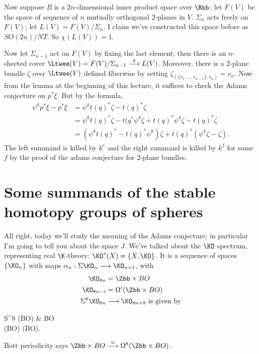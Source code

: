 Now suppose $B$ is a $2n$-dimensional inner product space over $\Rbb$; let $F(V)$ be the space of sequence of $n$ mutually orthogonal $2$-planes in $V$.  $\Sigma_n$ acts freely on $F(V)$; let $L(V) = F(V) / \Sigma_n$.  I claim we've constructed this space before as $SO(2n)/NT$.  So $\chi(L(V)) = 1$.

Now let $\Sigma_{n-1}$ act on $F(V)$ by fixing the last element; then there is an $n$-sheeted cover $\Ltwee(V) = F(V)/\Sigma_{n-1} \stackrel{q}{\to} L(V)$.  Moreover, there is a $2$-plane bundle $\zeta$ over $\Ltwee(V)$ defined fiberwise by setting $\zeta_{(\{v_1, \ldots, v_{n-1}\}, v_n)} = v_n$.  Now from the lemma at the beginning of this lecture, it suffices to check the Adams conjecture on $p^* \xi$.  But by the formula,
\begin{align*}
\psi^k p^* \xi - p^* \xi & = \psi^k t(q)^* \zeta - t(q)^* \zeta \\
& = \psi^k t(q)^* \zeta - t(q^* \psi^k \zeta + t(q)^* \psi^k \zeta - t(q)^* \zeta \\
& = (\psi^k t(q)^* - t(q)^* \psi^k) \zeta + t(q)^*(\psi^k \zeta - \zeta).
\end{align*}
The left summand is killed by $k^e$ and the right summand is killed by $k^f$ for some $f$ by the proof of the adams conjecture for $2$-plane bundles.

\fi
\BoxedNote{}

\section{Some summands of the stable homotopy groups of spheres} %
\label{SomeSummandsOfStableHomotopyOfSpheres}
\ifx\OutputSomeSummandsOfStableHomotopyOfSpheres\undefined\else
All right, today we'll study the meaning of the Adams conjecture; in particular I'm going to tell you about the space $J$.  We've talked about the $\KO$ spectrum, representing real $\K$-theory: $\KO^*(X) = \{X, \KO\}$.  It is a sequence of spaces $\{\KO_n\}$ with maps $\alpha_n: \Suspend \KO_n \to \KO_{n+1}$, with
\begin{align*}
\KO_{8n} & = \Zbb \times BO \\
\KO_{8n-i} & = \Loops^i (\Zbb \times BO) \\
\Suspend^8 \KO_{8n} & \to \KO_{8n+8} \hbox{ is given by}
\end{align*}
\begin{ctikzcd}
S^8 \sprod (\Zbb \times BO) \dar\rar & \Zbb \times BO \\
(\Zbb \times BO) \sprod (\Zbb \times BO)\urar["\mu"].
\end{ctikzcd}
Bott periodicity says $\Zbb \times BO \stackrel{\simeq}{\to} \Loops^8(\Zbb \times BO)$.

